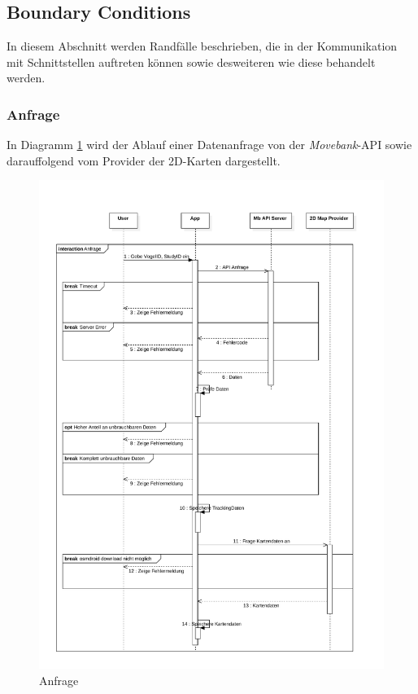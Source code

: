 \documentclass[12pt]{article} %
\begin{document}
\subsection{Boundary Conditions}
In diesem Abschnitt werden Randfälle beschrieben, die in der Kommunikation mit Schnittstellen auftreten können sowie desweiteren wie diese behandelt werden.
\subsubsection{Anfrage}
In Diagramm \ref{seqDiagAnfrage} wird der Ablauf einer Datenanfrage von der \textit{Movebank}-API sowie darauffolgend vom Provider der 2D-Karten dargestellt.
\begin{figure}[h]
		\includegraphics[height=0.95\textheight,trim={0 1cm 5cm 2cm}]{Diagramme/SeqDiag-Abfrage.pdf}
		\caption{Anfrage}
		\label{seqDiagAnfrage}
	\hspace*{\fill}
\end{figure}
\end{document}

